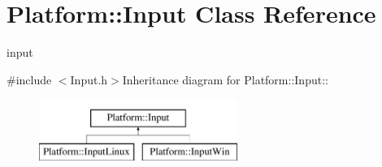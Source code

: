 \hypertarget{classPlatform_1_1Input}{
\section{Platform::Input Class Reference}
\label{classPlatform_1_1Input}
}


input  


{\ttfamily \#include $<$Input.h$>$}Inheritance diagram for Platform::Input::\begin{figure}[H]
\begin{center}
\leavevmode
\includegraphics[height=2cm]{classPlatform_1_1Input}
\end{center}
\end{figure}
